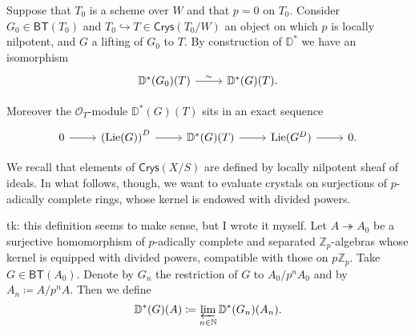 \begin{rem}[]\label{rem:DGValuationRestriction}
	Suppose that $T_0$ is a scheme over $W$ and that $p = 0$ on $T_0$.
	Consider $G_0 \in \mathsf{BT}(T_0)$ and $T_0 \hookrightarrow T \in \mathsf{Crys}(T_0/W)$
	an object on which $p$ is locally nilpotent, and $G$ a lifting of $G_0$ to $T$.
	By construction of $\mathbb{D}^*$ we have an isomorphism
	\begin{equation*}
	\begin{tikzcd}[row sep = 0ex
		,/tikz/column 1/.append style={anchor=base east}
		,/tikz/column 2/.append style={anchor=base west}]
		\mathbb{D}^*(G_0)(T) \arrow[r, "\sim", rightarrow] &
		\mathbb{D}^*(G)(T)
	.\end{tikzcd}
	\end{equation*} 

	Moreover the $\mathcal{O}_{ T }$-module $\mathbb{D}^*(G)(T)$ sits in an exact sequence
	\begin{equation*}
	\begin{tikzcd}
		0 \arrow[r, "", rightarrow] &
		\left( \mathrm{Lie}(G) \right)^D \arrow[r, "", rightarrow] &
		\mathbb{D}^*(G)(T) \arrow[r, "", rightarrow] &
		\mathrm{Lie}(G^D) \arrow[r, "", rightarrow] &
		0
	.\end{tikzcd}
	\end{equation*}
\end{rem}


\noindent
We recall that elements of $\mathsf{Crys}(X/S)$ are defined by
locally nilpotent sheaf of ideals.
In what follows, though, we want to evaluate crystals on
surjections of $p$-adically complete rings, whose kernel is endowed with divided powers.
\begin{defn}[]\label{defn:NotNilpotentEvaluation}
	tk: this definition seems to make sense, but I wrote it myself.
	Let $A \twoheadrightarrow A_0$ be a surjective homomorphism
	of $p$-adically complete and separated $\mathbb{Z}_{p}$-algebras
	whose kernel is equipped with divided powers, compatible with those on $p \mathbb{Z}_{p}$.
	Take $G \in \mathsf{BT}(A_0)$.
	Denote by $G_n$ the restriction of $G$ to $A_0/p^nA_0$
	and by $A_n \coloneqq A/p^nA$.
	Then we define
	\begin{equation*}
		\mathbb{D}^*(G)(A) \coloneqq
		\varprojlim_{n \in \mathbb{N}} \mathbb{D}^*(G_n)(A_n)
	.\end{equation*}
\end{defn}


